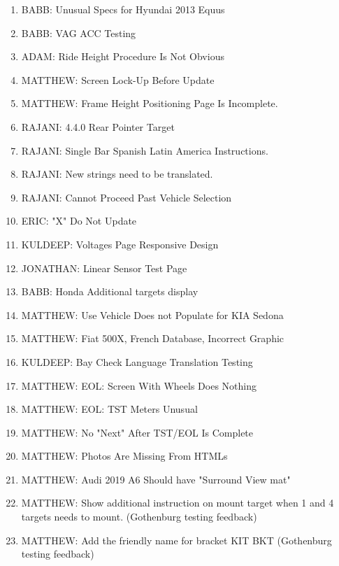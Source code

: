 \normalsize
\begin{enumerate}[leftmargin=!,labelindent=5pt,itemindent=-35pt]
\item {} BABB: Unusual Specs for Hyundai 2013 Equus
\item {} BABB: VAG ACC Testing
\item {} ADAM: Ride Height Procedure Is Not Obvious
\item {} MATTHEW: Screen Lock-Up Before Update
\item {} MATTHEW: Frame Height Positioning Page Is Incomplete.
\item {} RAJANI: 4.4.0 Rear Pointer Target
\item {} RAJANI: Single Bar Spanish Latin America Instructions.
\item {} RAJANI: New strings need to be translated.
\item {} RAJANI: Cannot Proceed Past Vehicle Selection
\item {} ERIC: "X" Do Not Update
\item {} KULDEEP: Voltages Page Responsive Design
\item {} JONATHAN: Linear Sensor Test Page
\item {} BABB: Honda Additional targets display
\item {} MATTHEW: Use Vehicle Does not Populate for KIA Sedona
\item {} MATTHEW: Fiat 500X, French Database, Incorrect Graphic
\item {} KULDEEP: Bay Check Language Translation Testing
\item {} MATTHEW: EOL: Screen With Wheels Does Nothing
\item {} MATTHEW: EOL: TST Meters Unusual
\item {} MATTHEW: No "Next" After TST/EOL Is Complete
\item {} MATTHEW: Photos Are Missing From HTMLs
\item {} MATTHEW: Audi 2019 A6 Should have "Surround View mat"
\item {} MATTHEW: Show additional instruction on mount target when 1 and 4 targets needs to mount. (Gothenburg testing feedback)
\item {} MATTHEW: Add the friendly name for bracket KIT BKT (Gothenburg testing feedback)

\end{enumerate}
